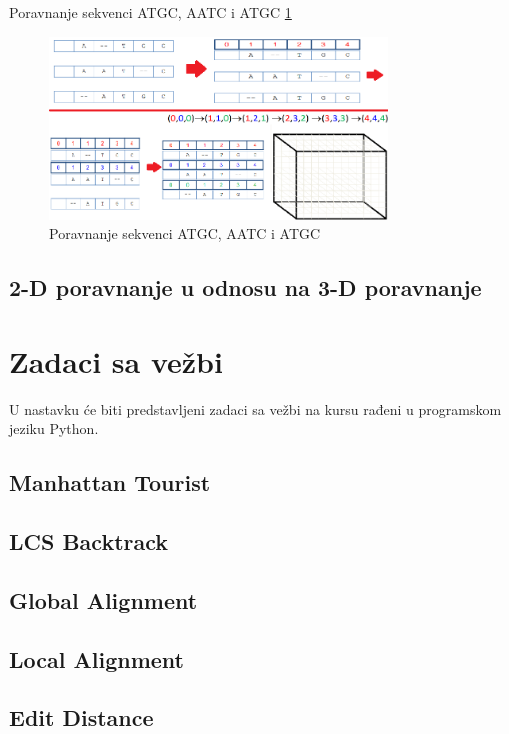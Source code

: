 Poravnanje sekvenci ATGC, AATC i ATGC \ref{slika:3d}

\begin{figure}[]
\centering
\includegraphics[width=0.8\textwidth]{poglavlja/5/slike/3dPoravnanja.png}
\caption{Poravnanje sekvenci ATGC, AATC i ATGC}
\label{slika:3d}
\end{figure}

\subsection{2-D poravnanje u odnosu na 3-D poravnanje}

\newpage
\section{Zadaci sa vežbi}
\setexamplecodestyle

U nastavku će biti predstavljeni zadaci sa vežbi na kursu rađeni u programskom jeziku Python.

\subsection{Manhattan Tourist}



\subsection{LCS Backtrack}



\subsection{Global Alignment}



\subsection{Local Alignment}



\subsection{Edit Distance}

